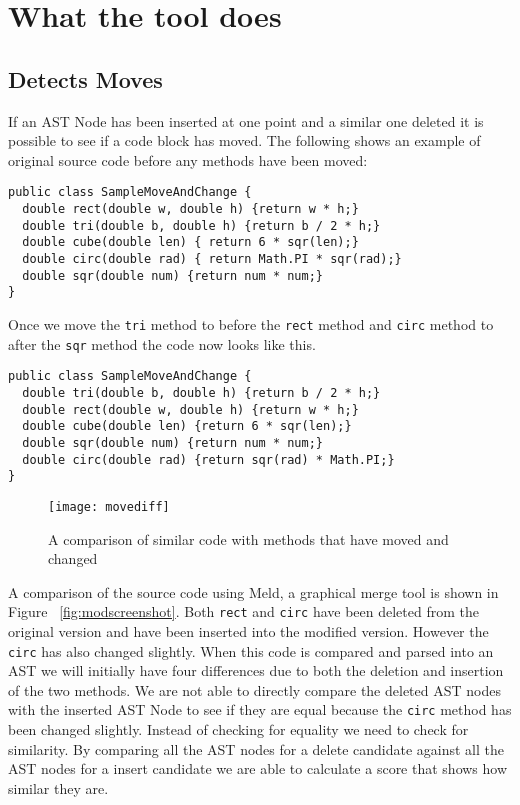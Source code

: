 \section{What the tool does}
\subsection{Detects Moves}
If an AST Node has been inserted at one point and a similar one deleted it is possible to see if a code block has moved.  
The following shows an example of original source code before any methods have been moved: 

\begin{lstlisting}
public class SampleMoveAndChange {
  double rect(double w, double h) {return w * h;}
  double tri(double b, double h) {return b / 2 * h;}
  double cube(double len) { return 6 * sqr(len);}
  double circ(double rad) { return Math.PI * sqr(rad);}
  double sqr(double num) {return num * num;}
}
\end{lstlisting}

Once we move the \lstinline{tri} method to before the \lstinline{rect} method and \lstinline{circ} method to after the \lstinline{sqr} method the code now looks like this.

\begin{lstlisting}
public class SampleMoveAndChange {
  double tri(double b, double h) {return b / 2 * h;}
  double rect(double w, double h) {return w * h;}
  double cube(double len) {return 6 * sqr(len);}
  double sqr(double num) {return num * num;}
  double circ(double rad) {return sqr(rad) * Math.PI;}
}
\end{lstlisting}


\begin{figure}[!t]
\begin{center}
 \texttt{[image: movediff]}
 \end{center}
\caption{A comparison of similar code with methods that have moved and changed}
 \label{fig:orig}
\end{figure}


A comparison of the source code using Meld, a graphical merge tool is shown in Figure ~\ref{fig:modscreenshot}.
Both \lstinline{rect} and \lstinline{circ} have been deleted from the original version and have been inserted into the modified version.  
However the \lstinline{circ} has also changed slightly. 
When this code is compared and parsed into an AST we will initially have four differences due to both the deletion and insertion of the two methods.    
We are not able to directly compare the deleted AST nodes with the inserted AST Node to see if they are equal because the \lstinline{circ} method has been changed slightly. 
Instead of checking for equality we need to check for similarity.
By comparing all the AST nodes for a delete candidate against all the AST nodes for a insert candidate we are able to calculate a score that shows how similar they are.

